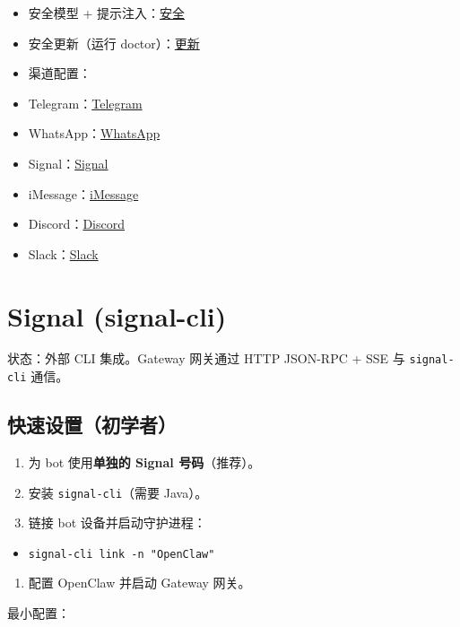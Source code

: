 \begin{itemize}
  \item 安全模型 + 提示注入：\href{/gateway/security}{安全}
  \item 安全更新（运行 doctor）：\href{/install/updating}{更新}
  \item 渠道配置：
  \item Telegram：\href{/channels/telegram}{Telegram}
  \item WhatsApp：\href{/channels/whatsapp}{WhatsApp}
  \item Signal：\href{/channels/signal}{Signal}
  \item iMessage：\href{/channels/imessage}{iMessage}
  \item Discord：\href{/channels/discord}{Discord}
  \item Slack：\href{/channels/slack}{Slack}
\end{itemize}



\clearpage

\section{Signal (signal-cli)}


状态：外部 CLI 集成。Gateway 网关通过 HTTP JSON-RPC + SSE 与 \texttt{signal-cli} 通信。

\subsection{快速设置（初学者）}


\begin{enumerate}
  \item 为 bot 使用\textbf{单独的 Signal 号码}（推荐）。
  \item 安装 \texttt{signal-cli}（需要 Java）。
  \item 链接 bot 设备并启动守护进程：
\end{enumerate}

\begin{itemize}
  \item \texttt{signal-cli link -n "OpenClaw"}
\end{itemize}

\begin{enumerate}
  \item 配置 OpenClaw 并启动 Gateway 网关。
\end{enumerate}


最小配置：

